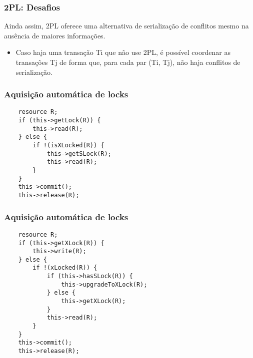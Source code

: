 \documentclass{beamer}
\begin{document}

\begin{frame}
\frametitle{2PL: Desafios}

Ainda assim, 2PL oferece uma alternativa de serialização de conflitos mesmo na ausência de maiores informações. 

\begin{itemize}
    \item Caso haja uma transação Ti que não use 2PL, é possível coordenar as transações Tj de forma que, para cada par (Ti, Tj), não haja conflitos de serialização.
\end{itemize}
\end{frame}


\begin{frame}[fragile] %
\frametitle{Aquisição automática de locks}
\begin{example}
\begin{verbatim}
    resource R;
    if (this->getLock(R)) {
        this->read(R);
    } else {
        if !(isXLocked(R)) {
            this->getSLock(R);
            this->read(R);
        }
    }
    this->commit();
    this->release(R);

\end{verbatim}
\end{example}
\end{frame}


\begin{frame}[fragile] %
\frametitle{Aquisição automática de locks}
\begin{example}
\begin{verbatim}
    resource R;
    if (this->getXLock(R)) {
        this->write(R);
    } else {
        if !(xLocked(R)) {
            if (this->hasSLock(R)) {
                this->upgradeToXLock(R);
            } else {
                this->getXLock(R);
            }
            this->read(R);
        }
    }
    this->commit();
    this->release(R);

\end{verbatim}
\end{example}
\end{frame}
\end{document}

